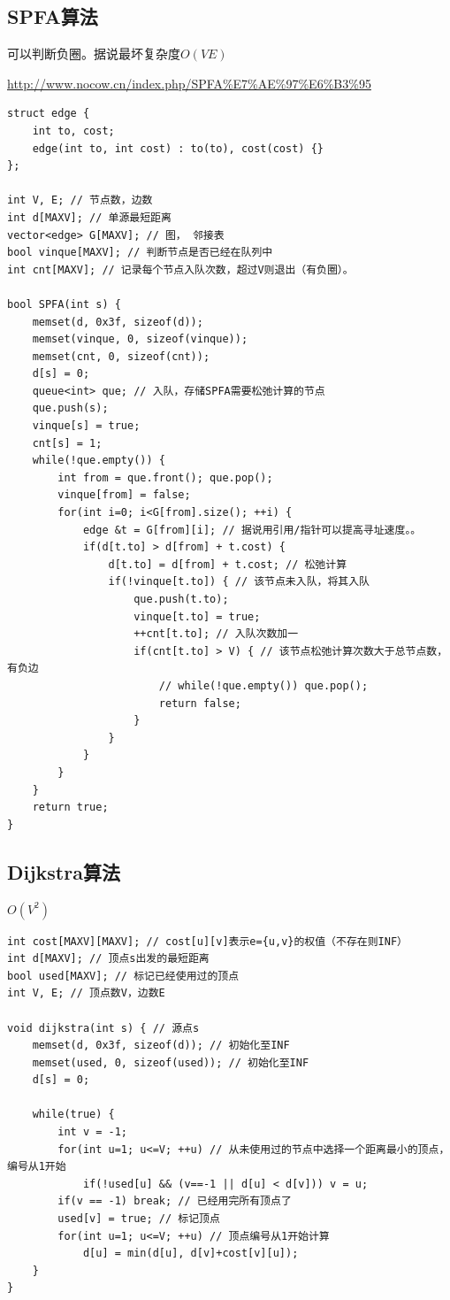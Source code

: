\documentclass[a4paper]{ctexrep}
\begin{document}
\subsection{SPFA算法}

可以判断负圈。据说最坏复杂度$O(VE)$

\url{http://www.nocow.cn/index.php/SPFA%E7%AE%97%E6%B3%95}

\begin{lstlisting}
struct edge {
	int to, cost;
	edge(int to, int cost) : to(to), cost(cost) {}
};

int V, E; // 节点数，边数
int d[MAXV]; // 单源最短距离
vector<edge> G[MAXV]; // 图， 邻接表
bool vinque[MAXV]; // 判断节点是否已经在队列中
int cnt[MAXV]; // 记录每个节点入队次数，超过V则退出（有负圈）。

bool SPFA(int s) {
	memset(d, 0x3f, sizeof(d));
	memset(vinque, 0, sizeof(vinque));
	memset(cnt, 0, sizeof(cnt));
	d[s] = 0;
	queue<int> que; // 入队，存储SPFA需要松弛计算的节点
	que.push(s);
	vinque[s] = true;
	cnt[s] = 1;
	while(!que.empty()) {
		int from = que.front(); que.pop();
		vinque[from] = false;
		for(int i=0; i<G[from].size(); ++i) {
			edge &t = G[from][i]; // 据说用引用/指针可以提高寻址速度。。
			if(d[t.to] > d[from] + t.cost) {
				d[t.to] = d[from] + t.cost; // 松弛计算
				if(!vinque[t.to]) { // 该节点未入队，将其入队
					que.push(t.to);
					vinque[t.to] = true;
					++cnt[t.to]; // 入队次数加一
					if(cnt[t.to] > V) { // 该节点松弛计算次数大于总节点数，有负边
						// while(!que.empty()) que.pop();
						return false;
					}
				}
			}
		}
	}
	return true;
}
\end{lstlisting}

\subsection{Dijkstra算法}
$O(V^2)$
\begin{lstlisting}
int cost[MAXV][MAXV]; // cost[u][v]表示e={u,v}的权值（不存在则INF）
int d[MAXV]; // 顶点s出发的最短距离
bool used[MAXV]; // 标记已经使用过的顶点
int V, E; // 顶点数V，边数E

void dijkstra(int s) { // 源点s
	memset(d, 0x3f, sizeof(d)); // 初始化至INF
	memset(used, 0, sizeof(used)); // 初始化至INF
	d[s] = 0;

	while(true) {
		int v = -1;
		for(int u=1; u<=V; ++u) // 从未使用过的节点中选择一个距离最小的顶点，编号从1开始
			if(!used[u] && (v==-1 || d[u] < d[v])) v = u;
		if(v == -1) break; // 已经用完所有顶点了
		used[v] = true; // 标记顶点
		for(int u=1; u<=V; ++u) // 顶点编号从1开始计算
			d[u] = min(d[u], d[v]+cost[v][u]);
	}
}
\end{lstlisting}
\end{document}
